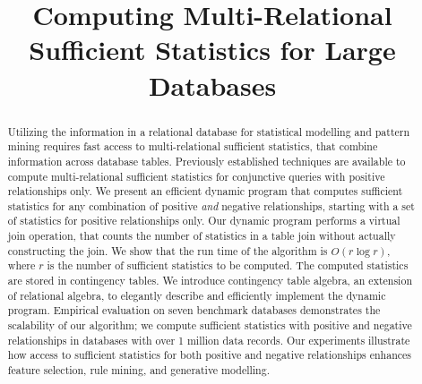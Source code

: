 \documentclass{acm_proc_article-sp}
\begin{document}
\title{Computing Multi-Relational Sufficient Statistics for  Large Databases}


\maketitle  

\begin{abstract} 
Utilizing the information in a relational database for statistical modelling and pattern mining requires fast access to multi-relational sufficient statistics, that combine information across database tables. 
Previously established techniques are available to compute multi-relational sufficient statistics for  conjunctive queries with positive relationships only. We present an efficient dynamic program that computes sufficient statistics for any combination of positive {\em and} negative relationships, starting with a set of statistics for positive relationships only.
Our dynamic program performs a virtual join operation, that counts the number of statistics in a table join without actually constructing the join. We show that the run time of the algorithm is $O(r \log r)$, where $r$ is the number of sufficient statistics to be computed.
The computed statistics are stored in contingency tables.
We introduce contingency table algebra, an extension of relational algebra, to elegantly describe and efficiently implement the dynamic program. 
Empirical evaluation on seven benchmark databases demonstrates the scalability of our algorithm; we compute sufficient statistics with positive and negative relationships in databases with over 1 million data records.  
Our experiments illustrate how access to sufficient statistics for both positive and negative relationships enhances feature selection, rule mining, and generative modelling.  
 \end{abstract}
\end{document}
